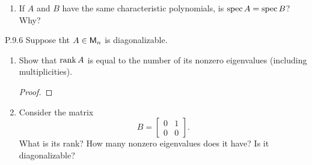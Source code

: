 \documentclass{../homework}
\begin{document}
\begin{problems}
\begin{enumerate}
\begin{solution}
    \end{solution}

  \item If \(A\) and \(B\) have the same characteristic polynomials,
    is \(\operatorname{spec} A = \operatorname{spec} B\)?  Why?

    \begin{solution}

    \end{solution}
  \end{enumerate}

\item[P.9.6] Suppose tht \(A \in \mathsf{M}_n\) is diagonalizable.
  \begin{enumerate}
  \item Show that \(\operatorname{rank} A\) is equal to the number of its nonzero
    eigenvalues (including multiplicities).

    \begin{solution}
      \begin{proof}

      \end{proof}
    \end{solution}

  \item Consider the matrix
    \[
      B =
      \begin{bmatrix}
        0 & 1 \\
        0 & 0
      \end{bmatrix}.
    \]
    What is its rank?  How many nonzero eigenvalues does it have?  Is
    it diagonalizable?

    \begin{solution}

    \end{solution}
  \end{enumerate}
\end{problems}
\end{document}
